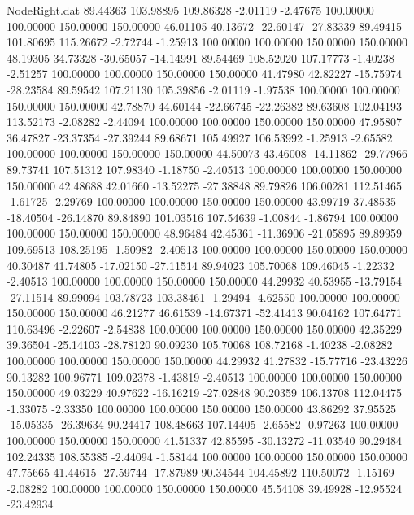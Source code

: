 \begin{filecontents}{NodeRight.dat}
  89.44363  103.98895  109.86328    -2.01119   -2.47675  100.00000  100.00000  150.00000  150.00000   46.01105   40.13672  -22.60147  -27.83339
  89.49415  101.80695  115.26672    -2.72744   -1.25913  100.00000  100.00000  150.00000  150.00000   48.19305   34.73328  -30.65057  -14.14991
  89.54469  108.52020  107.17773    -1.40238   -2.51257  100.00000  100.00000  150.00000  150.00000   41.47980   42.82227  -15.75974  -28.23584
  89.59542  107.21130  105.39856    -2.01119   -1.97538  100.00000  100.00000  150.00000  150.00000   42.78870   44.60144  -22.66745  -22.26382
  89.63608  102.04193  113.52173    -2.08282   -2.44094  100.00000  100.00000  150.00000  150.00000   47.95807   36.47827  -23.37354  -27.39244
  89.68671  105.49927  106.53992    -1.25913   -2.65582  100.00000  100.00000  150.00000  150.00000   44.50073   43.46008  -14.11862  -29.77966
  89.73741  107.51312  107.98340    -1.18750   -2.40513  100.00000  100.00000  150.00000  150.00000   42.48688   42.01660  -13.52275  -27.38848
  89.79826  106.00281  112.51465    -1.61725   -2.29769  100.00000  100.00000  150.00000  150.00000   43.99719   37.48535  -18.40504  -26.14870
  89.84890  101.03516  107.54639    -1.00844   -1.86794  100.00000  100.00000  150.00000  150.00000   48.96484   42.45361  -11.36906  -21.05895
  89.89959  109.69513  108.25195    -1.50982   -2.40513  100.00000  100.00000  150.00000  150.00000   40.30487   41.74805  -17.02150  -27.11514
  89.94023  105.70068  109.46045    -1.22332   -2.40513  100.00000  100.00000  150.00000  150.00000   44.29932   40.53955  -13.79154  -27.11514
  89.99094  103.78723  103.38461    -1.29494   -4.62550  100.00000  100.00000  150.00000  150.00000   46.21277   46.61539  -14.67371  -52.41413
  90.04162  107.64771  110.63496    -2.22607   -2.54838  100.00000  100.00000  150.00000  150.00000   42.35229   39.36504  -25.14103  -28.78120
  90.09230  105.70068  108.72168    -1.40238   -2.08282  100.00000  100.00000  150.00000  150.00000   44.29932   41.27832  -15.77716  -23.43226
  90.13282  100.96771  109.02378    -1.43819   -2.40513  100.00000  100.00000  150.00000  150.00000   49.03229   40.97622  -16.16219  -27.02848
  90.20359  106.13708  112.04475    -1.33075   -2.33350  100.00000  100.00000  150.00000  150.00000   43.86292   37.95525  -15.05335  -26.39634
  90.24417  108.48663  107.14405    -2.65582   -0.97263  100.00000  100.00000  150.00000  150.00000   41.51337   42.85595  -30.13272  -11.03540
  90.29484  102.24335  108.55385    -2.44094   -1.58144  100.00000  100.00000  150.00000  150.00000   47.75665   41.44615  -27.59744  -17.87989
  90.34544  104.45892  110.50072    -1.15169   -2.08282  100.00000  100.00000  150.00000  150.00000   45.54108   39.49928  -12.95524  -23.42934

\end{filecontents}
